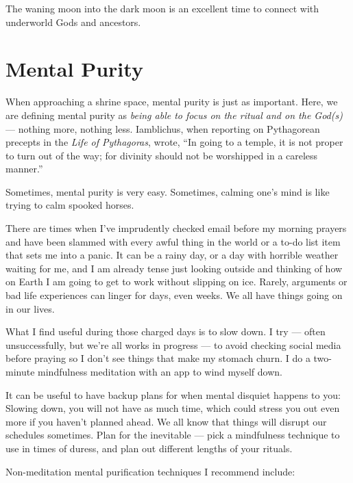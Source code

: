 \documentclass[
]{book}
\begin{document}
The waning moon into the dark moon is an excellent time to connect with underworld Gods and ancestors.

\hypertarget{mental-purity}{%
\section{Mental Purity}\label{mental-purity}}

When approaching a shrine space, mental purity is just as important. Here, we are defining mental purity as \emph{being able to focus on the ritual and on the God(s)} --- nothing more, nothing less. Iamblichus, when reporting on Pythagorean precepts in the \emph{Life of Pythagoras}, wrote, ``In going to a temple, it is not proper to turn out of the way; for divinity should not be worshipped in a careless manner.''

Sometimes, mental purity is very easy. Sometimes, calming one's mind is like trying to calm spooked horses.

There are times when I've imprudently checked email before my morning prayers and have been slammed with every awful thing in the world or a to-do list item that sets me into a panic. It can be a rainy day, or a day with horrible weather waiting for me, and I am already tense just looking outside and thinking of how on Earth I am going to get to work without slipping on ice. Rarely, arguments or bad life experiences can linger for days, even weeks. We all have things going on in our lives.

What I find useful during those charged days is to slow down. I try --- often unsuccessfully, but we're all works in progress --- to avoid checking social media before praying so I don't see things that make my stomach churn. I do a two-minute mindfulness meditation with an app to wind myself down.

It can be useful to have backup plans for when mental disquiet happens to you: Slowing down, you will not have as much time, which could stress you out even more if you haven't planned ahead. We all know that things will disrupt our schedules sometimes. Plan for the inevitable --- pick a mindfulness technique to use in times of duress, and plan out different lengths of your rituals.

Non-meditation mental purification techniques I recommend include:
\end{document}
